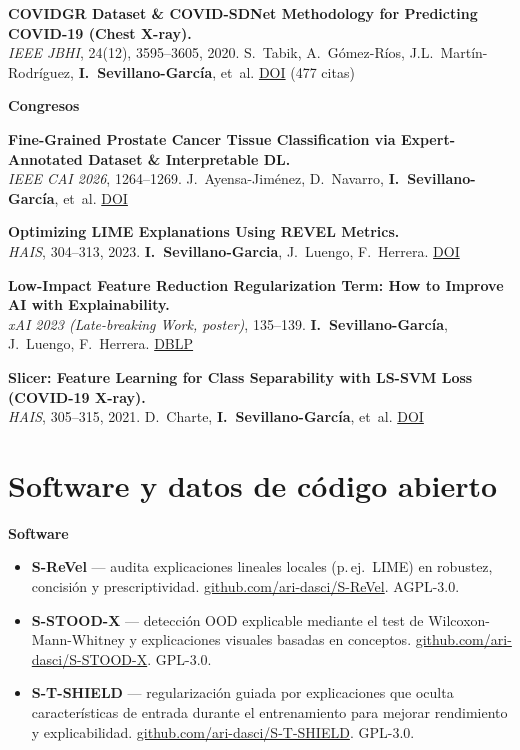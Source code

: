 \documentclass[10pt,a4paper]{article}
\newcommand{\blueitem}[1]{\textcolor{subtitleblue}{\textbf{#1}}}
\newcommand{\sub}[1]{\textcolor{subtle}{\footnotesize #1}}
\begin{document}
\textbf{COVIDGR Dataset \& COVID-SDNet Methodology for Predicting COVID-19 (Chest X-ray).} \\
\sub{\textit{IEEE JBHI}, 24(12), 3595--3605, 2020. S.~Tabik, A.~Gómez-Ríos, J.L.~Martín-Rodríguez, \textbf{I.~Sevillano-García}, et~al. \href{https://doi.org/10.1109/JBHI.2020.3037127}{DOI} \quad (477 citas)}

\blueitem{Congresos}

\textbf{Fine-Grained Prostate Cancer Tissue Classification via Expert-Annotated Dataset \& Interpretable DL.} \\
\sub{\textit{IEEE CAI 2026}, 1264--1269. J.~Ayensa-Jiménez, D.~Navarro, \textbf{I.~Sevillano-García}, et~al. \href{https://doi.org/10.1109/CAI68641.2026.11536250}{DOI}}

\textbf{Optimizing LIME Explanations Using REVEL Metrics.} \\
\sub{\textit{HAIS}, 304--313, 2023. \textbf{I.~Sevillano-Garcia}, J.~Luengo, F.~Herrera. \href{https://doi.org/10.1007/978-3-031-40725-3_26}{DOI}}

\textbf{Low-Impact Feature Reduction Regularization Term: How to Improve AI with Explainability.} \\
\sub{\textit{xAI 2023 (Late-breaking Work, poster)}, 135--139. \textbf{I.~Sevillano-García}, J.~Luengo, F.~Herrera. \href{https://dblp.org/rec/conf/xai/Sevillano-Garcia23}{DBLP}}

\textbf{Slicer: Feature Learning for Class Separability with LS-SVM Loss (COVID-19 X-ray).} \\
\sub{\textit{HAIS}, 305--315, 2021. D.~Charte, \textbf{I.~Sevillano-García}, et~al. \href{https://doi.org/10.978-3-030-86271-8_26}{DOI}}

\normalsize

\section*{Software y datos de código abierto}

\blueitem{Software}
\begin{itemize}
    \item \textbf{S-ReVel} --- audita explicaciones lineales locales (p.\,ej.\ LIME) en robustez, concisión y prescriptividad. \href{https://github.com/ari-dasci/S-ReVel}{github.com/ari-dasci/S-ReVel}. AGPL-3.0.
    \item \textbf{S-STOOD-X} --- detección OOD explicable mediante el test de Wilcoxon-Mann-Whitney y explicaciones visuales basadas en conceptos. \href{https://github.com/ari-dasci/S-STOOD-X}{github.com/ari-dasci/S-STOOD-X}. GPL-3.0.
    \item \textbf{S-T-SHIELD} --- regularización guiada por explicaciones que oculta características de entrada durante el entrenamiento para mejorar rendimiento y explicabilidad. \href{https://github.com/ari-dasci/S-T-SHIELD}{github.com/ari-dasci/S-T-SHIELD}. GPL-3.0.
\end{itemize}
\end{document}
